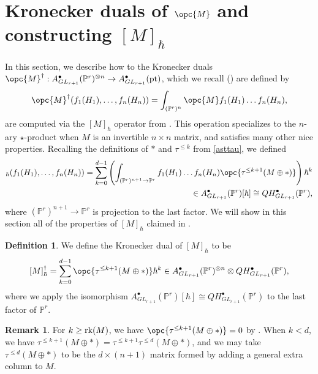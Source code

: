 \documentclass[12pt]{amsart}
\newcommand{\mb}{\mathbb}
\newcommand{\pt}{{\rm pt}}
\newcommand{\rk}{{\rm rk}}
\theoremstyle{plain}
\theoremstyle{definition}
\newtheorem{Def}{Definition}[section]
\newtheorem{Rem}[Thm]{Remark}
\theoremstyle{remark}
\begin{document}

\section{Kronecker duals of $\opc{M}$ and constructing $[M]_\hbar$}\label{poincaresection}
In this section, we describe how to the Kronecker duals $\opc{M}^\dagger : A^\bullet_{GL_{r+1}}(\mb{P}^r)^{\otimes n} \to A^\bullet_{GL_{r+1}}(\pt)$, which we recall () are defined by \[\opc{M}^\dagger(f_1(H_1), \ldots, f_n(H_n)) = \int_{(\mb{P}^r)^n} \opc{M} f_1(H_1) \ldots f_n(H_n),\] are computed via the $[M]_{\hbar}$ operator from . This operation specializes to the $n$-ary $\star$-product when $M$ is an invertible $n \times n$ matrix, and satisfies many other nice properties. Recalling the definitions of $\ast$ and $\tau^{\le k}$ from \cref{asttau}, we defined \begin{align*}[M]_\hbar(f_1(H_1),\ldots,f_n(H_n))=\sum_{k=0}^{d-1}\left(\int_{(\mb{P}^r)^{n+1}\to \mb{P}^r}f_1(H_1)\ldots f_n(H_n)\opc{\tau^{\le k+1}(M\oplus \ast)}\right)\hbar^k\\\in A^\bullet_{GL_{r+1}}(\mb{P}^r)[\hbar]\cong QH^\bullet_{GL_{r+1}}(\mb{P}^r),\end{align*} where $(\mb{P}^r)^{n+1}\to \mb{P}^r$ is projection to the last factor. We will show in this section all of the properties of $[M]_{\hbar}$ claimed in .



\begin{Def}
\label{Mhbardaggerdef}
We define the Kronecker dual of $[M]_{\hbar}$ to be
$$[M]_\hbar^\dagger = \sum_{k=0}^{d-1} \opc{\tau^{\le k+1}(M \oplus \ast)}\hbar^k \in A^\bullet_{GL_{r+1}}(\mb{P}^r)^{\otimes n}\otimes QH^\bullet_{GL_{r+1}}(\mb{P}^r),$$ where we apply the isomorphism $A^\bullet_{GL_{r+1}}(\mb{P}^r)[\hbar]\cong QH^\bullet_{GL_{r+1}}(\mb{P}^r)$ to the last factor of $\mb{P}^r$.
\end{Def}
\begin{Rem}\label{truncgen}
For $k \ge \rk(M)$, we have $\opc{\tau^{\le k+1}(M \oplus \ast)}=0$ by . When $k < d$, we have $\tau^{\le k+1}(M \oplus \ast)=\tau^{\le k+1}\tau^{\le d}(M \oplus \ast)$, and we may take $\tau^{\le d}(M \oplus \ast)$ to be the $d \times (n+1)$ matrix formed by adding a general extra column to $M$.
\end{Rem}
\end{document}
